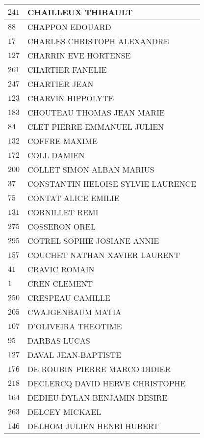 \begin{xltabular}{\linewidth}{|l|X|}
    $241$ & CHAILLEUX THIBAULT \\
    \hline
    $88$ & CHAPPON EDOUARD \\
    \hline
    $17$ & CHARLES CHRISTOPH ALEXANDRE \\
    \hline
    $127$ & CHARRIN EVE HORTENSE \\
    \hline
    $261$ & CHARTIER FANELIE \\
    \hline
    $247$ & CHARTIER JEAN \\
    \hline
    $123$ & CHARVIN HIPPOLYTE \\
    \hline
    $183$ & CHOUTEAU THOMAS JEAN MARIE \\
    \hline
    $84$ & CLET PIERRE-EMMANUEL JULIEN \\
    \hline
    $132$ & COFFRE MAXIME \\
    \hline
    $172$ & COLL DAMIEN \\
    \hline
    $200$ & COLLET SIMON ALBAN MARIUS \\
    \hline
    $37$ & CONSTANTIN HELOISE SYLVIE LAURENCE \\
    \hline
    $75$ & CONTAT ALICE EMILIE \\
    \hline
    $131$ & CORNILLET REMI \\
    \hline
    $275$ & COSSERON OREL \\
    \hline
    $295$ & COTREL SOPHIE JOSIANE ANNIE \\
    \hline
    $157$ & COUCHET NATHAN XAVIER LAURENT \\
    \hline
    $41$ & CRAVIC ROMAIN \\
    \hline
    $1$ & CREN CLEMENT \\
    \hline
    $250$ & CRESPEAU CAMILLE \\
    \hline
    $205$ & CWAJGENBAUM MATIA \\
    \hline
    $107$ & D'OLIVEIRA THEOTIME \\
    \hline
    $95$ & DARBAS LUCAS \\
    \hline
    $127$ & DAVAL JEAN-BAPTISTE \\
    \hline
    $176$ & DE ROUBIN PIERRE MARCO DIDIER \\
    \hline
    $218$ & DECLERCQ DAVID HERVE CHRISTOPHE \\
    \hline
    $164$ & DEDIEU DYLAN BENJAMIN DESIRE \\
    \hline
    $263$ & DELCEY MICKAEL \\
    \hline
    $146$ & DELHOM JULIEN HENRI HUBERT \\
    \hline

\end{xltabular}
